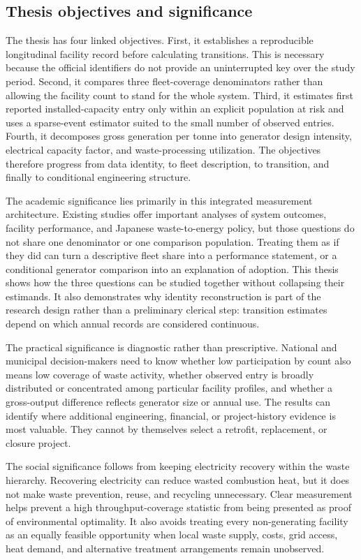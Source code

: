 \documentclass[12pt,letterpaper]{article}
\begin{document}
\subsection{Thesis objectives and significance}

The thesis has four linked objectives. First, it establishes a reproducible
longitudinal facility record before calculating transitions. This is necessary
because the official identifiers do not provide an uninterrupted key over the
study period. Second, it compares three fleet-coverage denominators rather than
allowing the facility count to stand for the whole system. Third, it estimates
first reported installed-capacity entry only within an explicit population at
risk and uses a sparse-event estimator suited to the small number of observed
entries. Fourth, it decomposes gross generation per tonne into generator design
intensity, electrical capacity factor, and waste-processing utilization. The
objectives therefore progress from data identity, to fleet description, to
transition, and finally to conditional engineering structure.

The academic significance lies primarily in this integrated measurement
architecture. Existing studies offer important analyses of system outcomes,
facility performance, and Japanese waste-to-energy policy, but those questions
do not share one denominator or one comparison population. Treating them as if
they did can turn a descriptive fleet share into a performance statement, or a
conditional generator comparison into an explanation of adoption. This thesis
shows how the three questions can be studied together without collapsing their
estimands. It also demonstrates why identity reconstruction is part of the
research design rather than a preliminary clerical step: transition estimates
depend on which annual records are considered continuous.

The practical significance is diagnostic rather than prescriptive. National
and municipal decision-makers need to know whether low participation by count
also means low coverage of waste activity, whether observed entry is broadly
distributed or concentrated among particular facility profiles, and whether a
gross-output difference reflects generator size or annual use. The results can
identify where additional engineering, financial, or project-history evidence
is most valuable. They cannot by themselves select a retrofit, replacement, or
closure project.

The social significance follows from keeping electricity recovery within the
waste hierarchy. Recovering electricity can reduce wasted combustion heat, but
it does not make waste prevention, reuse, and recycling unnecessary. Clear
measurement helps prevent a high throughput-coverage statistic from being
presented as proof of environmental optimality. It also avoids treating every
non-generating facility as an equally feasible opportunity when local waste
supply, costs, grid access, heat demand, and alternative treatment arrangements
remain unobserved.
\end{document}
